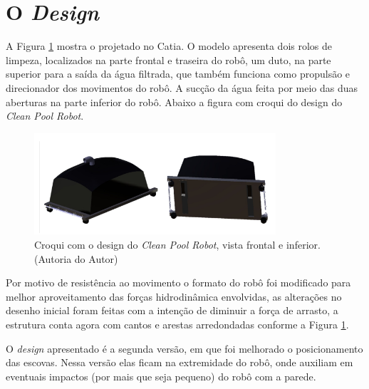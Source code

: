 \section{O \textit{Design}}
A Figura \ref{fig:croqui-design-cpr} mostra o \cpr projetado no \software Catia. O modelo apresenta dois rolos de limpeza, localizados na parte frontal e traseira do robô, um duto, na parte superior para a saída da água filtrada, que também funciona como propulsão e direcionador dos movimentos do robô. A sucção da água feita por meio das duas aberturas na parte inferior do robô. Abaixo a figura com croqui do design do \textit{Clean Pool Robot}.
\par
  \begin{figure}[h]
    \centering
    \includegraphics[width=0.8\textwidth]{figures/croqui-design-cpr.png}
    \caption{Croqui com o design do \textit{Clean Pool Robot}, vista frontal e inferior. (\textsf{Autoria do Autor})}
    \label{fig:croqui-design-cpr}
  \end{figure}
  \FloatBarrier
\par
Por motivo de resistência ao movimento o formato do robô foi modificado para melhor aproveitamento das forças hidrodinâmica envolvidas, as alterações no desenho inicial foram feitas com a intenção de diminuir a força de arrasto, a estrutura conta agora com cantos e arestas arredondadas conforme a Figura \ref{fig:croqui-design-cpr}.

O \textit{design} apresentado é a segunda versão, em que foi melhorado o posicionamento das escovas. Nessa versão elas ficam na extremidade do robô, onde auxiliam em eventuais impactos (por mais que seja pequeno) do robô com a parede.


